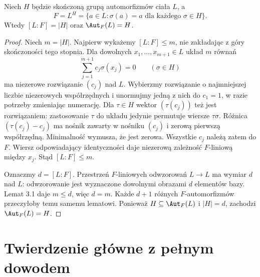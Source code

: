 \begin{twierdzenie}
Niech $H$ będzie skończoną grupą automorfizmów ciała $L$, a
\[
F=L^H=\{a\in L:\sigma(a)=a\text{ dla każdego }\sigma\in H\}.
\]
Wtedy $[L:F]=|H|$ oraz $\Aut_F(L)=H$.
\end{twierdzenie}
\begin{proof}
Niech $m=|H|$. Najpierw wykażemy $[L:F]\le m$, nie zakładając z góry skończoności tego stopnia. Dla dowolnych $x_1,\dots,x_{m+1}\in L$ układ $m$ równań
\[
\sum_{j=1}^{m+1}c_j\sigma(x_j)=0\qquad(\sigma\in H)
\]
ma niezerowe rozwiązanie $(c_j)$ nad $L$. Wybierzmy rozwiązanie o najmniejszej liczbie niezerowych współrzędnych i unormujmy jedną z nich do $c_1=1$, w razie potrzeby zmieniając numerację. Dla $\tau\in H$ wektor $(\tau(c_j))$ też jest rozwiązaniem: zastosowanie $\tau$ do układu jedynie permutuje wiersze $\tau\sigma$. Różnica $(\tau(c_j)-c_j)$ ma nośnik zawarty w nośniku $(c_j)$ i zerową pierwszą współrzędną. Minimalność wymusza, że jest zerowa. Wszystkie $c_j$ należą zatem do $F$. Wiersz odpowiadający identyczności daje niezerową zależność $F$-liniową między $x_j$. Stąd $[L:F]\le m$.

Oznaczmy $d=[L:F]$. Przestrzeń $F$-liniowych odwzorowań $L\to L$ ma wymiar $d$ nad $L$: odwzorowanie jest wyznaczone dowolnymi obrazami $d$ elementów bazy. Lemat 3.1 daje $m\le d$, więc $d=m$. Każde $d+1$ różnych $F$-automorfizmów przeczyłoby temu samemu lematowi. Ponieważ $H\subseteq\Aut_F(L)$ i $|H|=d$, zachodzi $\Aut_F(L)=H$.
\end{proof}

\section{Twierdzenie główne z pełnym dowodem}

